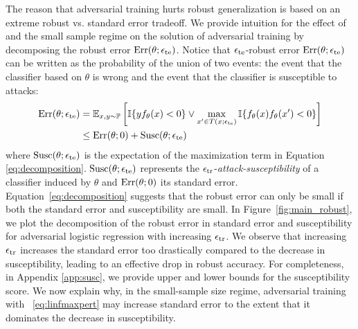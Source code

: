 The reason that adversarial training hurts
robust generalization is based on an extreme robust vs. standard
error tradeoff. We provide intuition for the effect of
\nameofattacks and the small sample regime
on the solution of adversarial training by decomposing the
robust error $\text{Err}(\theta;\epsilon_{\text{te}})$.
Notice that $\epsilon_{\text{te}}$-robust error $\text{Err}(\theta;\epsilon_{\text{te}})$ 
can be written as the probability of the union of two events: the
event that the classifier based on $\theta$ is wrong and the event
that the classifier is susceptible to attacks:
\begin{equation}
 \label{eq:decomposition}
\begin{aligned}
     \text{Err}(\theta;\epsilon_{\text{te}}) &=  \mathbb{E}_{x, y\sim \mathbb{P}}  \left[\mathbb{I}\{y f_\theta (x) <0\} \vee \max_{x' \in T({x};{\epsilon_{\text{te}}})} \mathbb{I}\{f_\theta(x) f_\theta(x')<0\} \right] \\
  &\leq \text{Err}(\theta;0) + \text{Susc}(\theta;\epsilon_{\text{te}})
\end{aligned}
\end{equation}
where $\text{Susc}(\theta;\epsilon_{\text{te}})$ is the expectation of the maximization term in Equation \eqref{eq:decomposition}.
$\text{Susc}(\theta;\epsilon_{\text{te}})$ represents the $\epsilon_{\text{tr}}$-\emph{attack-susceptibility} of a classifier
induced by $\theta$ and $\text{Err}(\theta;0)$ its standard error.
Equation~\eqref{eq:decomposition} suggests that
the robust error can only be small if both the standard error and
susceptibility are small. In Figure~\ref{fig:main_robust}, we
plot the decomposition of the robust error in standard error and susceptibility for adversarial logistic regression with increasing $\epsilon_{\text{tr}}$. We observe that increasing $\epsilon_{\text{tr}}$
increases the standard error too drastically compared to the decrease
in susceptibility, leading to an effective drop in robust accuracy. For completeness, in Appendix \ref{app:susc}, we provide upper and lower bounds for the susceptibility score.  We
now explain why, in the small-sample size regime, adversarial training
with \nameofattacks ~\eqref{eq:linfmaxpert} may increase standard
error to the extent that it dominates the decrease in susceptibility.



